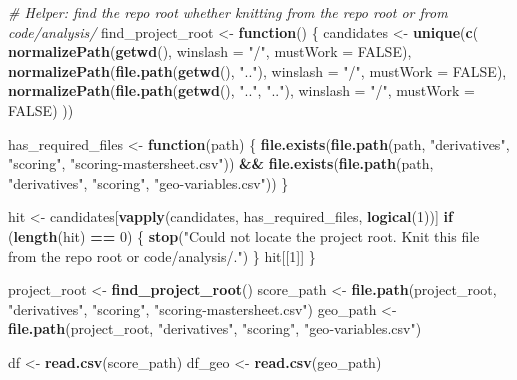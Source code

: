 \documentclass[
]{article}
\newenvironment{Shaded}{\begin{snugshade}}{\end{snugshade}}
\newcommand{\AttributeTok}[1]{\textcolor[rgb]{0.13,0.29,0.53}{#1}}
\newcommand{\CommentTok}[1]{\textcolor[rgb]{0.56,0.35,0.01}{\textit{#1}}}
\newcommand{\ConstantTok}[1]{\textcolor[rgb]{0.56,0.35,0.01}{#1}}
\newcommand{\ControlFlowTok}[1]{\textcolor[rgb]{0.13,0.29,0.53}{\textbf{#1}}}
\newcommand{\DecValTok}[1]{\textcolor[rgb]{0.00,0.00,0.81}{#1}}
\newcommand{\FunctionTok}[1]{\textcolor[rgb]{0.13,0.29,0.53}{\textbf{#1}}}
\newcommand{\NormalTok}[1]{#1}
\newcommand{\OtherTok}[1]{\textcolor[rgb]{0.56,0.35,0.01}{#1}}
\newcommand{\SpecialCharTok}[1]{\textcolor[rgb]{0.81,0.36,0.00}{\textbf{#1}}}
\newcommand{\StringTok}[1]{\textcolor[rgb]{0.31,0.60,0.02}{#1}}
\begin{document}
\begin{Shaded}
\begin{Highlighting}[]
\CommentTok{\# Helper: find the repo root whether knitting from the repo root or from code/analysis/}
\NormalTok{find\_project\_root }\OtherTok{\textless{}{-}} \ControlFlowTok{function}\NormalTok{() \{}
\NormalTok{  candidates }\OtherTok{\textless{}{-}} \FunctionTok{unique}\NormalTok{(}\FunctionTok{c}\NormalTok{(}
    \FunctionTok{normalizePath}\NormalTok{(}\FunctionTok{getwd}\NormalTok{(), }\AttributeTok{winslash =} \StringTok{"/"}\NormalTok{, }\AttributeTok{mustWork =} \ConstantTok{FALSE}\NormalTok{),}
    \FunctionTok{normalizePath}\NormalTok{(}\FunctionTok{file.path}\NormalTok{(}\FunctionTok{getwd}\NormalTok{(), }\StringTok{".."}\NormalTok{), }\AttributeTok{winslash =} \StringTok{"/"}\NormalTok{, }\AttributeTok{mustWork =} \ConstantTok{FALSE}\NormalTok{),}
    \FunctionTok{normalizePath}\NormalTok{(}\FunctionTok{file.path}\NormalTok{(}\FunctionTok{getwd}\NormalTok{(), }\StringTok{".."}\NormalTok{, }\StringTok{".."}\NormalTok{), }\AttributeTok{winslash =} \StringTok{"/"}\NormalTok{, }\AttributeTok{mustWork =} \ConstantTok{FALSE}\NormalTok{)}
\NormalTok{  ))}

\NormalTok{  has\_required\_files }\OtherTok{\textless{}{-}} \ControlFlowTok{function}\NormalTok{(path) \{}
    \FunctionTok{file.exists}\NormalTok{(}\FunctionTok{file.path}\NormalTok{(path, }\StringTok{"derivatives"}\NormalTok{, }\StringTok{"scoring"}\NormalTok{, }\StringTok{"scoring{-}mastersheet.csv"}\NormalTok{)) }\SpecialCharTok{\&\&}
      \FunctionTok{file.exists}\NormalTok{(}\FunctionTok{file.path}\NormalTok{(path, }\StringTok{"derivatives"}\NormalTok{, }\StringTok{"scoring"}\NormalTok{, }\StringTok{"geo{-}variables.csv"}\NormalTok{))}
\NormalTok{  \}}

\NormalTok{  hit }\OtherTok{\textless{}{-}}\NormalTok{ candidates[}\FunctionTok{vapply}\NormalTok{(candidates, has\_required\_files, }\FunctionTok{logical}\NormalTok{(}\DecValTok{1}\NormalTok{))]}
  \ControlFlowTok{if}\NormalTok{ (}\FunctionTok{length}\NormalTok{(hit) }\SpecialCharTok{==} \DecValTok{0}\NormalTok{) \{}
    \FunctionTok{stop}\NormalTok{(}\StringTok{"Could not locate the project root. Knit this file from the repo root or code/analysis/."}\NormalTok{)}
\NormalTok{  \}}
\NormalTok{  hit[[}\DecValTok{1}\NormalTok{]]}
\NormalTok{\}}

\NormalTok{project\_root }\OtherTok{\textless{}{-}} \FunctionTok{find\_project\_root}\NormalTok{()}
\NormalTok{score\_path   }\OtherTok{\textless{}{-}} \FunctionTok{file.path}\NormalTok{(project\_root, }\StringTok{"derivatives"}\NormalTok{, }\StringTok{"scoring"}\NormalTok{, }\StringTok{"scoring{-}mastersheet.csv"}\NormalTok{)}
\NormalTok{geo\_path     }\OtherTok{\textless{}{-}} \FunctionTok{file.path}\NormalTok{(project\_root, }\StringTok{"derivatives"}\NormalTok{, }\StringTok{"scoring"}\NormalTok{, }\StringTok{"geo{-}variables.csv"}\NormalTok{)}

\NormalTok{df     }\OtherTok{\textless{}{-}} \FunctionTok{read.csv}\NormalTok{(score\_path)}
\NormalTok{df\_geo }\OtherTok{\textless{}{-}} \FunctionTok{read.csv}\NormalTok{(geo\_path)}
\end{Highlighting}
\end{Shaded}
\end{document}
